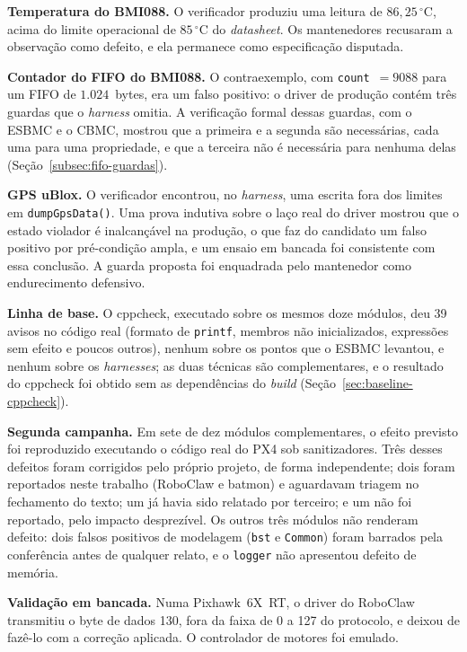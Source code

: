 \textbf{Temperatura do BMI088.} O verificador produziu uma leitura de
$86{,}25\,^{\circ}$C, acima do limite operacional de $85\,^{\circ}$C do
\textit{datasheet}. Os mantenedores recusaram a observação como defeito, e ela
permanece como especificação disputada.

\textbf{Contador do FIFO do BMI088.} O contraexemplo, com
\texttt{count}~$= 9088$ para um FIFO de $1.024$~bytes, era um falso positivo: o
driver de produção contém três guardas que o \textit{harness} omitia. A verificação formal dessas guardas, com o ESBMC e o CBMC, mostrou que a primeira e a segunda são necessárias, cada uma para uma propriedade, e que a terceira não é necessária para nenhuma delas (Seção~\ref{subsec:fifo-guardas}).

\textbf{GPS uBlox.} O verificador encontrou, no \textit{harness}, uma escrita
fora dos limites em \texttt{dumpGpsData()}. Uma prova indutiva sobre o laço real
do driver mostrou que o estado violador é inalcançável na produção, o que faz do candidato um falso positivo por pré-condição ampla, e um ensaio
em bancada foi consistente com essa conclusão. A guarda proposta foi enquadrada
pelo mantenedor como endurecimento defensivo.

\textbf{Linha de base.} O cppcheck, executado sobre os mesmos doze módulos, deu 39 avisos no código real (formato de \texttt{printf}, membros não inicializados, expressões sem efeito e poucos outros), nenhum sobre os pontos que o ESBMC levantou, e nenhum sobre os \textit{harnesses}; as duas técnicas são complementares, e o resultado do cppcheck foi obtido sem as dependências do \textit{build} (Seção~\ref{sec:baseline-cppcheck}).

\textbf{Segunda campanha.} Em sete de dez módulos complementares, o efeito
previsto foi reproduzido executando o código real do PX4 sob sanitizadores.
Três desses defeitos foram corrigidos pelo próprio projeto, de forma
independente; dois foram reportados neste trabalho (RoboClaw e batmon) e
aguardavam triagem no fechamento do texto; um já havia sido relatado por
terceiro; e um não foi reportado, pelo impacto desprezível. Os outros três módulos
não renderam defeito: dois falsos positivos de modelagem (\texttt{bst} e \texttt{Common})
foram barrados pela conferência antes de qualquer relato, e o \texttt{logger} não
apresentou defeito de memória.

\textbf{Validação em bancada.} Numa Pixhawk~6X~RT, o driver do RoboClaw
transmitiu o byte de dados 130, fora da faixa de 0 a 127 do protocolo, e deixou
de fazê-lo com a correção aplicada. O controlador de motores foi emulado.

